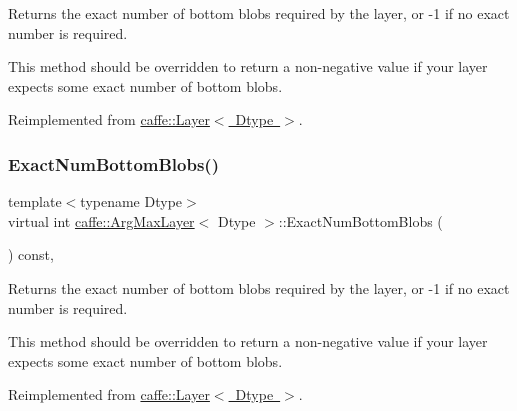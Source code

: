 Returns the exact number of bottom blobs required by the layer, or -\/1 if no exact number is required. 

This method should be overridden to return a non-\/negative value if your layer expects some exact number of bottom blobs. 

Reimplemented from \mbox{\hyperlink{classcaffe_1_1_layer_a8e5ee0494d85f5f55fc4396537cbc60f}{caffe\+::\+Layer$<$ Dtype $>$}}.

\mbox{\label{classcaffe_1_1_arg_max_layer_a786fb4163cd0a31a564100ce7e4b74b2}} 
\subsubsection{\texorpdfstring{Exact\+Num\+Bottom\+Blobs()}{ExactNumBottomBlobs()}\hspace{0.1cm}{\footnotesize\ttfamily [2/2]}}
{\footnotesize\ttfamily template$<$typename Dtype$>$ \\
virtual int \mbox{\hyperlink{classcaffe_1_1_arg_max_layer}{caffe\+::\+Arg\+Max\+Layer}}$<$ Dtype $>$\+::Exact\+Num\+Bottom\+Blobs (\begin{DoxyParamCaption}{ }\end{DoxyParamCaption}) const\hspace{0.3cm}{\ttfamily [inline]}, {\ttfamily [virtual]}}



Returns the exact number of bottom blobs required by the layer, or -\/1 if no exact number is required. 

This method should be overridden to return a non-\/negative value if your layer expects some exact number of bottom blobs. 

Reimplemented from \mbox{\hyperlink{classcaffe_1_1_layer_a8e5ee0494d85f5f55fc4396537cbc60f}{caffe\+::\+Layer$<$ Dtype $>$}}.

\mbox{\label{classcaffe_1_1_arg_max_layer_a45e9c6e7b572b915be8731fcb6403695}} 
